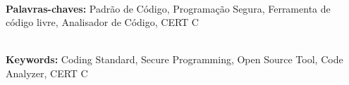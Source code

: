 \documentclass[a4paper,12pt]{pkg/monografia}
\begin{document}





\\
\noindent \textbf{Palavras-chaves:} Padrão de Código, Programação Segura, Ferramenta de código livre, Analisador de Código, CERT C


\\
\noindent \textbf{Keywords:} Coding Standard, Secure Programming, Open Source Tool, Code Analyzer, CERT C


\tableofcontents
\thispagestyle{empty}

\listoffigures
\thispagestyle{empty}

\listoftables
\thispagestyle{empty}

% 

\pagestyle{ruledheader}







%

\renewcommand{\bibname}{Referências}

\nocite{*}


%

\end{document}
